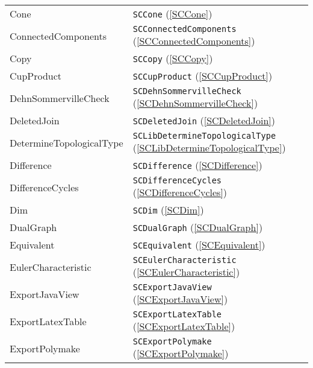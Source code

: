 \documentclass[a4paper,11pt]{report}
\begin{document}
{{\begin{center}
\begin{tabular}{ll}
Cone&
\texttt{SCCone} (\ref{SCCone})\\
ConnectedComponents&
\texttt{SCConnectedComponents} (\ref{SCConnectedComponents})\\
Copy&
\texttt{SCCopy} (\ref{SCCopy})\\
CupProduct&
\texttt{SCCupProduct} (\ref{SCCupProduct})\\
DehnSommervilleCheck&
\texttt{SCDehnSommervilleCheck} (\ref{SCDehnSommervilleCheck})\\
DeletedJoin&
\texttt{SCDeletedJoin} (\ref{SCDeletedJoin})\\
DetermineTopologicalType&
\texttt{SCLibDetermineTopologicalType} (\ref{SCLibDetermineTopologicalType})\\
Difference&
\texttt{SCDifference} (\ref{SCDifference})\\
DifferenceCycles&
\texttt{SCDifferenceCycles} (\ref{SCDifferenceCycles})\\
Dim&
\texttt{SCDim} (\ref{SCDim})\\
DualGraph&
\texttt{SCDualGraph} (\ref{SCDualGraph})\\
Equivalent&
\texttt{SCEquivalent} (\ref{SCEquivalent})\\
EulerCharacteristic&
\texttt{SCEulerCharacteristic} (\ref{SCEulerCharacteristic})\\
ExportJavaView&
\texttt{SCExportJavaView} (\ref{SCExportJavaView})\\
ExportLatexTable&
\texttt{SCExportLatexTable} (\ref{SCExportLatexTable})\\
ExportPolymake&
\texttt{SCExportPolymake} (\ref{SCExportPolymake})\\
\end{tabular}\\[2mm]
\end{center}

}}
\end{document}
